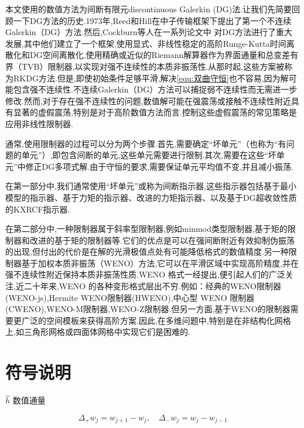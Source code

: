 \documentclass{book}
\begin{document}
本文使用的数值方法为间断有限元discontinuous Galerkin (DG)法.让我们先简要回顾一下DG方法的历史.1973年,Reed和Hill\cite{Reed_Hill}在中子传输框架下提出了第一个不连续Galerkin（DG）方法.然后,Cockburn等人在一系列论文中 \cite{RKDG2,RKDG3,RKDG4,RKDG5} 对DG方法进行了重大发展,其中他们建立了一个框架,使用显式、非线性稳定的高阶Runge-Kutta时间离散化和DG空间离散化,使用精确或近似的Riemann解算器作为界面通量和总变差有界（TVB）限制器\cite{TVB},以实现对强不连续性的本质非振荡性.从那时起,这些方案被称为RKDG方法.但是,即使初始条件足够平滑,解决\eqref{equ:双曲守恒}也不容易,因为解可能包含强不连续性.不连续Galerkin（DG）方法可以捕捉弱不连续性而无需进一步修改.然而,对于存在强不连续性的问题,数值解可能在强震荡或接触不连续性附近具有显著的虚假震荡,特别是对于高阶数值方法而言.控制这些虚假震荡的常见策略是应用非线性限制器.

通常,使用限制器的过程可以分为两个步骤.首先,需要确定“坏单元”（也称为“有问题的单元”）,即包含间断的单元,这些单元需要进行限制.其次,需要在这些“坏单元”中修正DG多项式解.由于守恒的要求,需要保证单元平均值不变,并且减小振荡.

在第一部分中,我们通常使用“坏单元”或称为间断指示器,这些指示器包括基于最小模型的指示器\cite{RKDG2}、基于力矩的指示器\cite{基于力矩的指示器}、改进的力矩指示器\cite{改进的基于矩的限制器}、以及基于DG超收敛性质的KXRCF指示器\cite{基于DG超收敛性质的KXRCF指示器}.

在第二部分中,一种限制器属于斜率型限制器,例如minmod类型限制器\cite{RKDG2,RKDG3,RKDG4,RKDG5},基于矩的限制器\cite{基于矩的限制器}和改进的基于矩的限制器\cite{改进的基于矩的限制器}等.它们的优点是可以在强间断附近有效抑制伪振荡的出现,但付出的代价是在解的光滑极值点处有可能降低格式的数值精度.另一种限制器基于加权本质非振荡（WENO）方法\cite{WENO1,WENO2,WENO3,WENO4,WENO5},它可以在平滑区域中实现高阶精度,并在强不连续性附近保持本质非振荡性质.WENO 格式一经提出,便引起人们的广泛关注,近二十年来,WENO 的各种变形格式层出不穷.例如：经典的WENO限制器(WENO-js)\cite{WENO-js1,WENO-js2},Hermite WENO限制器(HWENO)\cite{HWENO1,HWENO2},中心型 WENO 限制器(CWENO)\cite{CWENO},WENO-M限制器\cite{WENO-M},WENO-Z限制器\cite{WENO-Z}.但另一方面,基于WENO的限制器需要更广泛的空间模板来获得高阶方案.因此,在多维问题中,特别是在非结构化网格上,如三角形网格或四面体网格中实现它们是困难的.

\section{符号说明}
$\hat{h}$ 数值通量

\begin{equation}
  \Delta_{+} w_{j}=w_{j+1}-w_{j}, \quad \Delta_{-} w_{j}=w_{j}-w_{j-1}
\end{equation}
\end{document}
